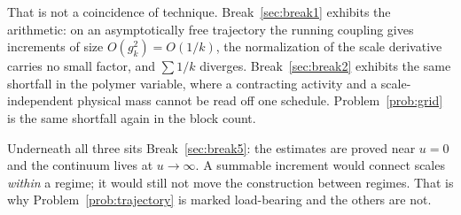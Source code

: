 That is not a coincidence of technique. Break~\ref{sec:break1} exhibits
the arithmetic: on an asymptotically free trajectory the running
coupling gives increments of size $O(g_k^2) = O(1/k)$, the normalization
of the scale derivative carries no small factor, and $\sum 1/k$
diverges. Break~\ref{sec:break2} exhibits the same shortfall in the
polymer variable, where a contracting activity and a scale-independent
physical mass cannot be read off one schedule. Problem~\ref{prob:grid}
is the same shortfall again in the block count.

Underneath all three sits Break~\ref{sec:break5}: the estimates are
proved near $u = 0$ and the continuum lives at $u \to \infty$. A
summable increment would connect scales \emph{within} a regime; it would
still not move the construction between regimes. That is why
Problem~\ref{prob:trajectory} is marked load-bearing and the others are
not.
